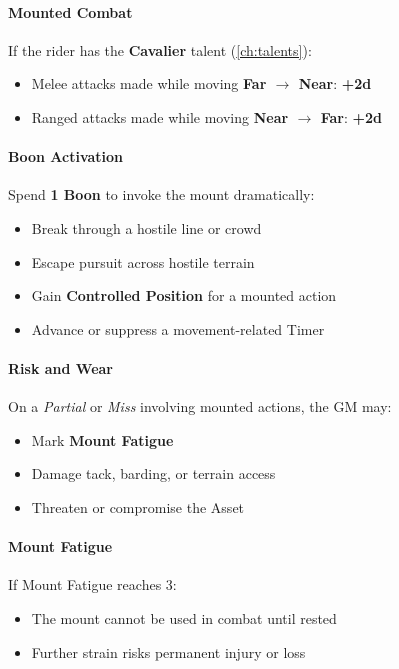 \paragraph{Mounted Combat}
If the rider has the \textbf{Cavalier} talent (\ref{ch:talents}):
\begin{itemize}
  \item Melee attacks made while moving \textbf{Far $\rightarrow$ Near}: \textbf{+2d}
  \item Ranged attacks made while moving \textbf{Near $\rightarrow$ Far}: \textbf{+2d}
\end{itemize}

\paragraph{Boon Activation}
Spend \textbf{1 Boon} to invoke the mount dramatically:
\begin{itemize}
  \item Break through a hostile line or crowd
  \item Escape pursuit across hostile terrain
  \item Gain \textbf{Controlled Position} for a mounted action
  \item Advance or suppress a movement-related Timer
\end{itemize}

\paragraph{Risk and Wear}
On a \emph{Partial} or \emph{Miss} involving mounted actions, the GM may:
\begin{itemize}
  \item Mark \textbf{Mount Fatigue}
  \item Damage tack, barding, or terrain access
  \item Threaten or compromise the Asset
\end{itemize}

\paragraph{Mount Fatigue}
If Mount Fatigue reaches 3:
\begin{itemize}
  \item The mount cannot be used in combat until rested
  \item Further strain risks permanent injury or loss
\end{itemize}

